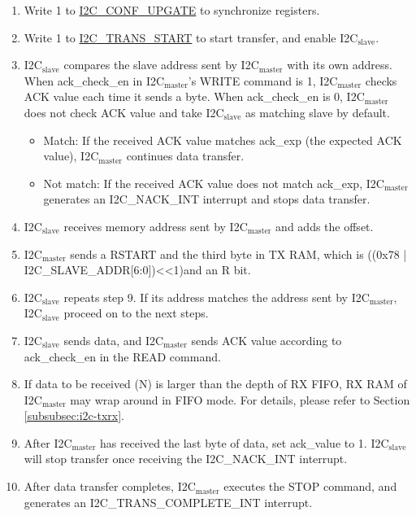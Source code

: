 \documentclass[main\_\_EN.tex]{subfiles}
\begin{document}
\begin{enumerate}
\item Write 1 to \hyperref[fielddesc:I2CCONFUPGATE]{I2C\_CONF\_UPGATE} to synchronize registers.
\item Write 1 to \hyperref[fielddesc:I2CTRANSSTART]{I2C\_TRANS\_START} to start transfer, and enable I2C$_\text{slave}$.

\item I2C$_\text{slave}$ compares the slave address sent by I2C$_\text{master}$ with its own address. When ack\_check\_en in I2C$_\text{master}$'s WRITE command is 1, I2C$_\text{master}$ checks ACK value each time it sends a byte. When ack\_check\_en is 0, I2C$_\text{master}$ does not check ACK value and take I2C$_\text{slave}$ as matching slave by default.
\begin{itemize}
\item Match: If the received ACK value matches ack\_exp (the expected ACK value), I2C$_\text{master}$ continues data transfer.
\item Not match: If the received ACK value does not match ack\_exp, I2C$_\text{master}$ generates an I2C\_NACK\_INT interrupt and stops data transfer.
\end{itemize}
\item I2C$_\text{slave}$ receives memory address sent by I2C$_\text{master}$ and adds the offset.
\item I2C$_\text{master}$ sends a RSTART and the third byte in TX RAM, which is ((0x78 | I2C\_SLAVE\_ADDR[6:0])<<1)and an R bit.
\item I2C$_\text{slave}$ repeats step 9. If its address matches the address sent by I2C$_\text{master}$, I2C$_\text{slave}$ proceed on to the next steps.


\item I2C$_\text{slave}$ sends data, and I2C$_\text{master}$ sends ACK value according to ack\_check\_en in the READ command.

\item If data to be received (N) is larger than the depth of RX FIFO, RX RAM of I2C$_\text{master}$ may wrap around in FIFO mode. For details, please refer to Section \ref{subsubsec:i2c-txrx}.

\item After I2C$_\text{master}$ has received the last byte of data, set ack\_value to 1. I2C$_\text{slave}$ will stop transfer once receiving the I2C\_NACK\_INT interrupt.

\item After data transfer completes, I2C$_\text{master}$ executes the STOP command, and generates an I2C\_TRANS\_COMPLETE\_INT interrupt.
\end{enumerate}
\end{document}
